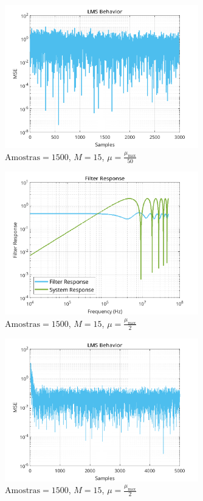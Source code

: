 \documentclass[a4paper,10pt]{article}
\begin{document}
\begin{enumerate}
				\begin{figure}[!ht]
					\centering
					\includegraphics[width=0.75\textwidth]{figs/L3Q5_mu_50.png}
					\caption{$\text{Amostras} = 1500$, $M = 15$, $\mu = \frac{\mu_{\text{max}}}{50}$}
					\label{fig:mu_50}
				\end{figure}

				\begin{figure}[!ht]
					\centering
					\includegraphics[width=0.75\textwidth]{figs/L3Q5_filter_response.png}
					\caption{$\text{Amostras} = 1500$, $M = 15$, $\mu = \frac{\mu_{\text{max}}}{2}$}
					\label{fig:filter_response}
				\end{figure}

				\begin{figure}[!ht]
					\centering
					\includegraphics[width=0.75\textwidth]{figs/L3Q6_A_mse.png}
					\caption{$\text{Amostras} = 1500$, $M = 15$, $\mu = \frac{\mu_{\text{max}}}{2}$}
					\label{fig:L3Q6A1}
				\end{figure}


\end{enumerate}
\end{document}
